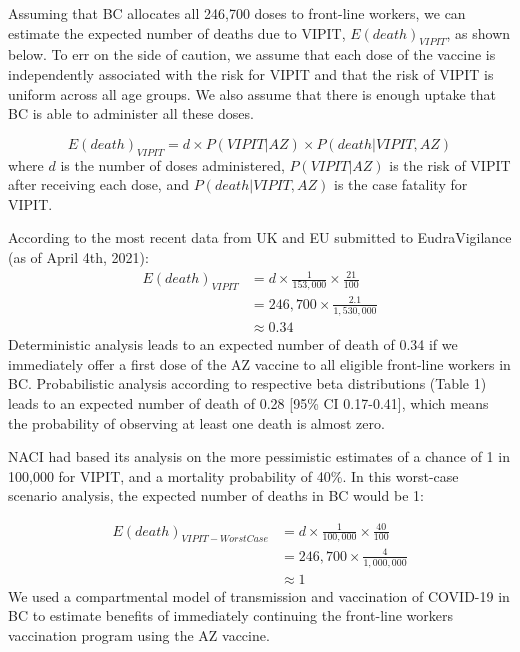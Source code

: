 \documentclass[]{interact}
\theoremstyle{plain}%
\theoremstyle{definition}
\theoremstyle{remark}
\begin{document}
Assuming that BC allocates all 246,700 doses to front-line workers, we
can estimate the expected number of deaths due to VIPIT,
\(E(death)_{VIPIT}\), as shown below. To err on the side of caution, we
assume that each dose of the vaccine is independently associated with
the risk for VIPIT and that the risk of VIPIT is uniform across all age
groups. We also assume that there is enough uptake that BC is able to
administer all these doses.

\[
E(death)_{VIPIT}  = d \times P(VIPIT|AZ) \times P(death|VIPIT, AZ)
\] where \(d\) is the number of doses administered, \(P(VIPIT|AZ)\) is
the risk of VIPIT after receiving each dose, and \(P(death|VIPIT, AZ)\)
is the case fatality for VIPIT.

According to the most recent data from UK and EU submitted to
EudraVigilance (as of April 4th, 2021): \[
\begin{aligned}
E(death)_{VIPIT} & = d \times \frac{1}{153,000} \times \frac{21}{100} \\
& = 246,700 \times \frac{2.1}{1,530,000} \\
& \approx 0.34
\end{aligned}
\] Deterministic analysis leads to an expected number of death of 0.34
if we immediately offer a first dose of the AZ vaccine to all eligible
front-line workers in BC. Probabilistic analysis according to respective
beta distributions (Table 1) leads to an expected number of death of
0.28 {[}95\% CI 0.17-0.41{]}, which means the probability of observing
at least one death is almost zero.

NACI had based its analysis on the more pessimistic estimates of a
chance of 1 in 100,000 for VIPIT, and a mortality probability of 40\%.
In this worst-case scenario analysis, the expected number of deaths in
BC would be 1:

\[
\begin{aligned}
E(death)_{VIPIT-Worst Case} & = d \times \frac{1}{100,000} \times \frac{40}{100} \\
& = 246,700 \times \frac{4}{1,000,000} \\
& \approx 1
\end{aligned}
\] We used a compartmental model of transmission and vaccination of
COVID-19 in BC to estimate benefits of immediately continuing the
front-line workers vaccination program using the AZ vaccine.
\end{document}
